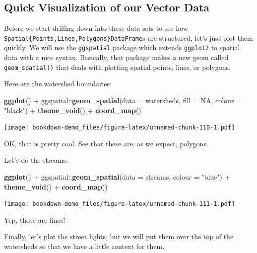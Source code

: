 \documentclass[]{book}
\newenvironment{Shaded}{\begin{snugshade}}{\end{snugshade}}
\newcommand{\KeywordTok}[1]{\textcolor[rgb]{0.13,0.29,0.53}{\textbf{{#1}}}}
\newcommand{\DataTypeTok}[1]{\textcolor[rgb]{0.13,0.29,0.53}{{#1}}}
\newcommand{\StringTok}[1]{\textcolor[rgb]{0.31,0.60,0.02}{{#1}}}
\newcommand{\OtherTok}[1]{\textcolor[rgb]{0.56,0.35,0.01}{{#1}}}
\newcommand{\NormalTok}[1]{{#1}}
\theoremstyle{definition}
\theoremstyle{definition}
\theoremstyle{remark}
\begin{document}
\subsection{Quick Visualization of our Vector
Data}\label{quick-visualization-of-our-vector-data}

Before we start drilling down into these data sets to see how
\texttt{Spatial\{Points,Lines,Polygons\}DataFrame}s are structured,
let's just plot them quickly. We will use the \texttt{ggspatial} package
which extends \texttt{ggplot2} to spatial data with a nice syntax.
Basically, that package makes a new geom called \texttt{geom\_spatial()}
that deals with plotting spatial points, lines, or polygons.

Here are the watershed boundaries:

\begin{Shaded}
\begin{Highlighting}[]
\KeywordTok{ggplot}\NormalTok{() +}
\StringTok{  }\NormalTok{ggspatial::}\KeywordTok{geom_spatial}\NormalTok{(}\DataTypeTok{data =} \NormalTok{watersheds, }\DataTypeTok{fill =} \OtherTok{NA}\NormalTok{, }\DataTypeTok{colour =} \StringTok{"black"}\NormalTok{) +}
\StringTok{  }\KeywordTok{theme_void}\NormalTok{() +}
\StringTok{  }\KeywordTok{coord_map}\NormalTok{()}
\end{Highlighting}
\end{Shaded}

\texttt{[image: bookdown-demo\_files/figure-latex/unnamed-chunk-110-1.pdf]}

OK, that is pretty cool. See that these are, as we expect, polygons.

Let's do the streams:

\begin{Shaded}
\begin{Highlighting}[]
\KeywordTok{ggplot}\NormalTok{() +}
\StringTok{  }\NormalTok{ggspatial::}\KeywordTok{geom_spatial}\NormalTok{(}\DataTypeTok{data =} \NormalTok{streams, }\DataTypeTok{colour =} \StringTok{"blue"}\NormalTok{) +}
\StringTok{  }\KeywordTok{theme_void}\NormalTok{() +}
\StringTok{  }\KeywordTok{coord_map}\NormalTok{()}
\end{Highlighting}
\end{Shaded}

\texttt{[image: bookdown-demo\_files/figure-latex/unnamed-chunk-111-1.pdf]}

Yep, those are lines!

Finally, let's plot the street lights, but we will put them over the top
of the watersheds so that we have a little context for them.
\end{document}

